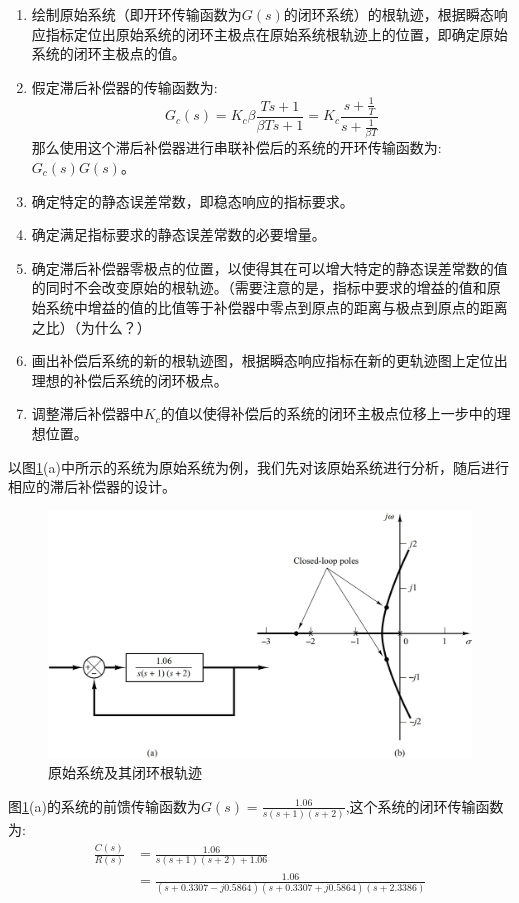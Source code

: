 \documentclass{article}
\numberwithin{equation}{section}
\numberwithin{figure}{section}
\begin{document}
\begin{enumerate}
    \item 绘制原始系统（即开环传输函数为$G(s)$的闭环系统）的根轨迹，根据瞬态响应指标定位出原始系统的闭环主极点在原始系统根轨迹上的位置，即确定原始系统的闭环主极点的值。
    \item 假定滞后补偿器的传输函数为:
    \begin{equation}
        G_c(s)=K_c\beta\frac{Ts+1}{\beta Ts+1}=K_c\frac{s+\frac{1}{T}}{s+\frac{1}{\beta T}}
    \end{equation}
    那么使用这个滞后补偿器进行串联补偿后的系统的开环传输函数为:$G_c(s)G(s)$。
    \item 确定特定的静态误差常数，即稳态响应的指标要求。
    \item 确定满足指标要求的静态误差常数的必要增量。
    \item 确定滞后补偿器零极点的位置，以使得其在可以增大特定的静态误差常数的值的同时不会改变原始的根轨迹。（需要注意的是，指标中要求的增益的值和原始系统中增益的值的比值等于补偿器中零点到原点的距离与极点到原点的距离之比）（为什么？）
    \item 画出补偿后系统的新的根轨迹图，根据瞬态响应指标在新的更轨迹图上定位出理想的补偿后系统的闭环极点。
    \item 调整滞后补偿器中$K_c$的值以使得补偿后的系统的闭环主极点位移上一步中的理想位置。
\end{enumerate}

以图\ref{ExampleofLagCompensation_originalsystem}(a)中所示的系统为原始系统为例，我们先对该原始系统进行分析，随后进行相应的滞后补偿器的设计。

\begin{figure}
    \centering
    \includegraphics[width=.6\textwidth]{Chapter6/ExampleofLagCompensation_originalsystem.png} %
    \caption{原始系统及其闭环根轨迹} %
    \label{ExampleofLagCompensation_originalsystem} %
\end{figure}

图\ref{ExampleofLagCompensation_originalsystem}(a)的系统的前馈传输函数为$G(s)=\frac{1.06}{s(s+1)(s+2)}$,这个系统的闭环传输函数为:
\begin{equation}
    \begin{split}
        \frac{C(s)}{R(s)}&=\frac{1.06}{s(s+1)(s+2)+1.06}\\
        &=\frac{1.06}{(s+0.3307-j0.5864)(s+0.3307+j0.5864)(s+2.3386)}
    \end{split}
\end{equation}
\end{document}
